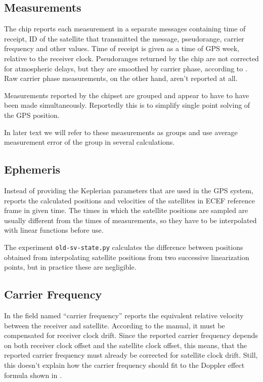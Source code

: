 \subsection{Measurements}
\label{sec:impl-sirf-measurements}
The \sirf chip reports each measurement in a separate messages containing
time of receipt, ID of the satellite that transmitted the message, pseudorange,
carrier frequency and other values.
Time of receipt is given as a time of GPS week, relative to the receiver clock.
Pseudoranges returned by the \sirf chip are not corrected for atmospheric delays,
but they are smoothed by carrier phase, according to \cite{sirf-protocol}.
Raw carrier phase measurements, on the other hand, aren't reported at all.

Measurements reported by the chipset are grouped and appear
to have to have been made simultaneously.
Reportedly this is to simplify single point solving of the GPS position.

In later text we will refer to these measurements as groups and use average
measurement error of the group in several calculations.

\subsection{Ephemeris}
\label{sec:impl-sirf-ephemeris}
Instead of providing the Keplerian parameters that are used in the GPS system,
\sirf reports the calculated positions and velocities of the satellites in ECEF
reference frame in given time.
The times in which the satellite positions are sampled are usually different
from the times of measurements, so they have to be interpolated with linear functions
before use.

The experiment \verb=old-sv-state.py= calculates the difference between positions
obtained from interpolating satellite positions from two successive linearization points, but in
practice these are negligible.

\subsection{Carrier Frequency}
\label{sec:impl-carrier-freq}
In the field named \enquote{carrier frequency} \sirf reports the equivalent relative velocity
between the receiver and satellite.
According to the manual, it must be compensated for receiver clock drift.
Since the reported carrier frequency depends on both receiver clock offset and 
the satellite clock offset, this means, that the reported carrier frequency must already
be corrected for satellite clock drift.
Still, this doesn't explain how the carrier frequency should fit to the Doppler
effect formula shown in .

